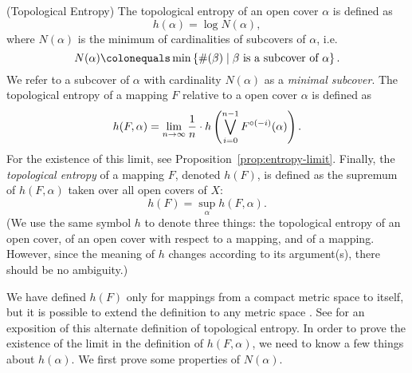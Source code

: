 \documentclass[12pt,twoside,draft]{book}
\begin{document}
\begin{definition}
  (Topological Entropy)
  The topological entropy of an open cover $\alpha$ is defined as
  \begin{equation*}
    h(\alpha) = \log N(\alpha),
  \end{equation*}
  where $N(\alpha)$ is the minimum of cardinalities of subcovers of $\alpha$, i.e.
  \begin{equation*}
    N(\alpha) \ceq \min\setst{ \#(\beta) }{ \beta \mbox{ is a subcover of } \alpha}.
  \end{equation*}
  We refer to a subcover of $\alpha$ with cardinality $N(\alpha)$ as a \textit{minimal subcover}.
  The topological entropy of a mapping $F$ relative to a open cover $\alpha$ is defined as
  \begin{equation*}
    h(F,\alpha) = \lim\limits_{n \to \infty} \frac{1}{n} \cdot h\left (  \bigvee\limits_{i=0}^{n-1} F^{\circ (-i)}(\alpha)  \right ).
  \end{equation*}
  For the existence of this limit, see Proposition~\ref{prop:entropy-limit}.
  Finally, the \textit{topological entropy} of a mapping $F$, denoted $h(F)$, is defined as the supremum of $h(F, \alpha)$ taken over all open covers of $X$:
  \begin{equation*}
    h(F) = \sup\limits_\alpha h(F,\alpha).
  \end{equation*}
  (We use the same symbol $h$ to denote three things: the topological entropy of an open cover, of an open cover with respect to a mapping, and of a mapping.
  However, since the meaning of $h$ changes according to its argument(s), there should be no ambiguity.)
  \label{defn:t-entropy}
\end{definition}
We have defined $h(F)$ only for mappings from a compact metric space to itself, but it is possible to extend the definition to any metric space \citep{bowen}.
  See \citep{walters} for an exposition of this alternate definition of topological entropy.
In order to prove the existence of the limit in the definition of $h(F, \alpha)$, we need to know a few things about $h(\alpha)$.
We first prove some properties of $N(\alpha)$.
\end{document}
